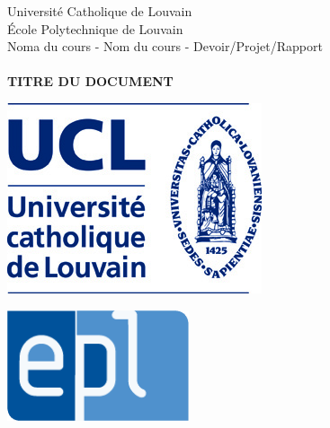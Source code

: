 \thispagestyle{empty}
\begin{center}

        Université Catholique de Louvain\\
	    École Polytechnique de Louvain\\
	    Noma du cours - Nom du cours - Devoir/Projet/Rapport
	    \\[2.0cm]
	    \HRule{2pt}\\
	    \vspace{0.2cm}
	    \LARGE \textbf{\uppercase{Titre du document}}
	    \HRule{2pt}\\

\end{center}
	\vspace{1cm}

	\begin{minipage}{0.5\textwidth}
		\begin{center}
			\includegraphics[scale=0.29]{images/logo-ucl.jpg}\\[1cm]
		\end{center}
	\end{minipage}
	\begin{minipage}{0.5\textwidth}
		\begin{center}
			\includegraphics[width=0.4\textwidth]{images/logo-epl.png}\\[1cm]
		\end{center}
	\end{minipage}

	\vspace{1cm}

